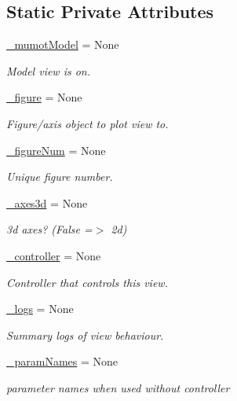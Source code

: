 \subsection*{Static Private Attributes}
\begin{DoxyCompactItemize}
\item 
\hyperlink{class_mu_mo_t_1_1_mu_mo_tview_aeacd9541246371f0db5cc3e3779762fa}{\+\_\+mumot\+Model} = None
\begin{DoxyCompactList}\small\item\em Model view is on. \end{DoxyCompactList}\item 
\hyperlink{class_mu_mo_t_1_1_mu_mo_tview_abf6d9f6be3898e307415d4598cde264d}{\+\_\+figure} = None
\begin{DoxyCompactList}\small\item\em Figure/axis object to plot view to. \end{DoxyCompactList}\item 
\hyperlink{class_mu_mo_t_1_1_mu_mo_tview_a5748371a5f2e09033908d21bb12f94c0}{\+\_\+figure\+Num} = None
\begin{DoxyCompactList}\small\item\em Unique figure number. \end{DoxyCompactList}\item 
\hyperlink{class_mu_mo_t_1_1_mu_mo_tview_a506ccaeadc9c6f4102cf4e06f5a6be2a}{\+\_\+axes3d} = None
\begin{DoxyCompactList}\small\item\em 3d axes? (False =$>$ 2d) \end{DoxyCompactList}\item 
\hyperlink{class_mu_mo_t_1_1_mu_mo_tview_a15f56ca9811d1e67d721fa64f9b0dc1e}{\+\_\+controller} = None
\begin{DoxyCompactList}\small\item\em Controller that controls this view. \end{DoxyCompactList}\item 
\hyperlink{class_mu_mo_t_1_1_mu_mo_tview_ac0ad5d0ca27f2668c0676334ee73ff52}{\+\_\+logs} = None
\begin{DoxyCompactList}\small\item\em Summary logs of view behaviour. \end{DoxyCompactList}\item 
\hyperlink{class_mu_mo_t_1_1_mu_mo_tview_ac7734326ac8dbbf9bd0d2c9838633195}{\+\_\+param\+Names} = None
\begin{DoxyCompactList}\small\item\em parameter names when used without controller \end{DoxyCompactList}\item 

\end{DoxyCompactItemize}
